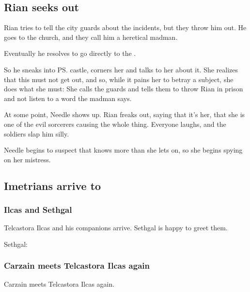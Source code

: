 \subsection{Rian seeks out \Tiroco}
Rian tries to tell the city guards about the incidents, but they throw him out. He goes to the church, and they call him a heretical madman. 

Eventually he resolves to go directly to the \rinyuth. 

So he sneaks into \ps{\Tiroco} castle, corners her and talks to her about it. 
She realizes that this must not get out, and so, while it pains her to betray a subject, she does what she must: She calls the guards and tells them to throw Rian in prison and not listen to a word the madman says. 

At some point, Needle shows up. Rian freaks out, saying that it's her, that she is one of the evil sorcerers causing the whole thing. Everyone laughs, and the soldiers slap him silly. 

Needle begins to suspect that \Tiroco{} knows more than she lets on, so she begins spying on her mistress. 









\subsection{Imetrians arrive to \Forclin}





\subsubsection{Ilcas and Sethgal}
Telcastora Ilcas and his companions arrive. 
Sethgal is happy to greet them. 

\begin{prose}
  Sethgal: 
  
\end{prose}





\subsubsection{Carzain meets Telcastora Ilcas again}
Carzain meets Telcastora Ilcas again. 

